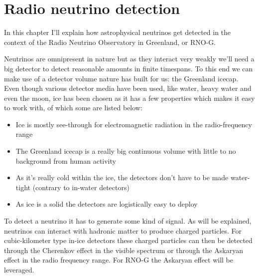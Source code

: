 \chapter{Radio neutrino detection}
\label{chap:RND}
In this chapter I'll explain how astrophysical neutrinos get detected in the
context of the Radio Neutrino Observatory in Greenland, or RNO-G.

Neutrinos are omnipresent in nature but as they interact very weakly we'll need
a big detector to detect reasonable amounts in finite timespans.  
To this end we can make use of a detector volume nature has
built for us: the Greenland icecap.  Even though various detector media
have been used, like water\cite{SuperKamio}, heavy water
\cite{SNO:1999crp} and
even the moon\cite{numoon}, ice has been chosen as it has a few properties which makes it easy to
work with, of which some are listed below:
\begin{itemize}
  \item Ice is mostly see-through for electromagnetic radiation in the radio-frequency range
  \item The Greenland icecap is a really big continuous volume with little to no background from human activity
  \item As it's really cold within the ice, the detectors don't have to be made water-tight (contrary
	  to in-water detectors)
  \item As ice is a solid the detectors are logistically easy to deploy
\end{itemize}

To detect a neutrino it has to generate some kind of signal. As will be
explained, neutrinos can interact with hadronic matter to produce charged
particles. For cubic-kilometer type in-ice detectors these charged particles can then
be detected through the Cherenkov effect in the visible spectrum or
through the Askaryan effect in the radio frequency range.
For RNO-G the Askaryan effect will be leveraged.

